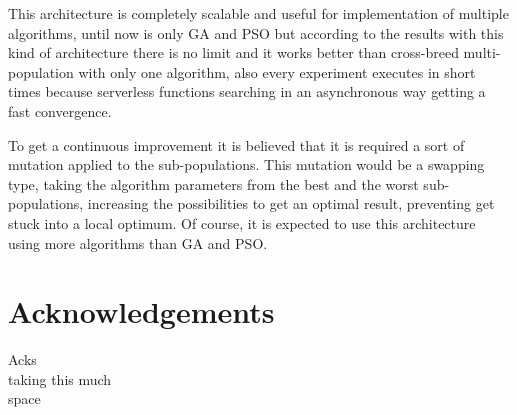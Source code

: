 \documentclass[runningheads]{llncs}
\begin{document}
This architecture is completely scalable and useful for implementation of
multiple algorithms, until now is only GA and PSO but according to the results
with this kind of architecture there is no limit and it works better than
cross-breed multi-population with only one algorithm, also every experiment executes in
short times because serverless functions searching in an asynchronous way
getting a fast convergence.



To get a continuous improvement it is believed that it is required a sort of
mutation applied to the sub-populations. This mutation would be a swapping type,
taking the algorithm parameters from the best and the worst sub-populations,
increasing the possibilities to get an optimal result, preventing get stuck into
a local optimum. Of course, it is expected to use this architecture using more
algorithms than GA and PSO.

\section*{Acknowledgements}

Acks\\
taking this much\\
space


      
  
\end{document}
